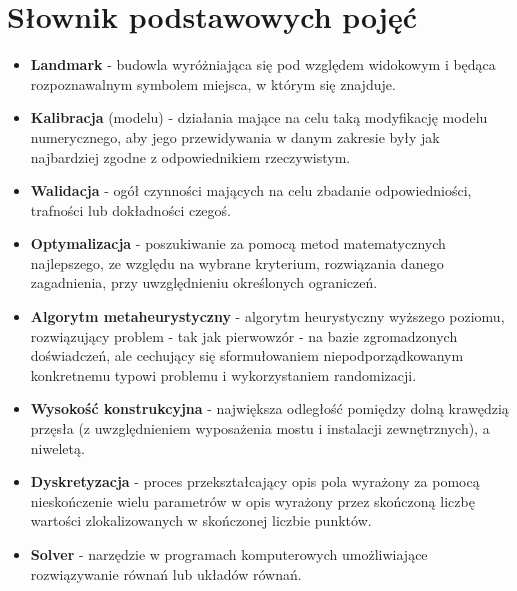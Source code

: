 \chapter*{Słownik podstawowych pojęć}
\begin{itemize}[label = {},leftmargin=*]
\item \textbf{Landmark} - budowla wyróżniająca się pod względem widokowym i będąca rozpoznawalnym symbolem miejsca, w którym się znajduje.
\item \textbf{Kalibracja} (modelu) - działania mające na celu taką modyfikację modelu numerycznego, aby jego przewidywania w danym zakresie były jak najbardziej zgodne z odpowiednikiem rzeczywistym.
\item \textbf{Walidacja} - ogół czynności mających na celu zbadanie odpowiedniości, trafności lub dokładności czegoś.
\item \textbf{Optymalizacja} - poszukiwanie za pomocą metod matematycznych najlepszego, ze względu na wybrane kryterium, rozwiązania danego zagadnienia, przy uwzględnieniu określonych ograniczeń.
\item \textbf{Algorytm metaheurystyczny} - algorytm heurystyczny wyższego poziomu, rozwiązujący problem - tak jak pierwowzór - na bazie zgromadzonych doświadczeń, ale cechujący się sformułowaniem niepodporządkowanym konkretnemu typowi problemu i wykorzystaniem randomizacji. 
\item \textbf{Wysokość konstrukcyjna} - największa odległość pomiędzy dolną krawędzią przęsła (z uwzględnieniem wyposażenia mostu i instalacji zewnętrznych), a niweletą.
\item \textbf{Dyskretyzacja} - proces przekształcający opis pola wyrażony za pomocą nieskończenie wielu parametrów w opis wyrażony przez skończoną liczbę wartości zlokalizowanych w skończonej liczbie punktów.
\item \textbf{Solver} - narzędzie w programach komputerowych umożliwiające rozwiązywanie równań lub układów równań.
\end{itemize}